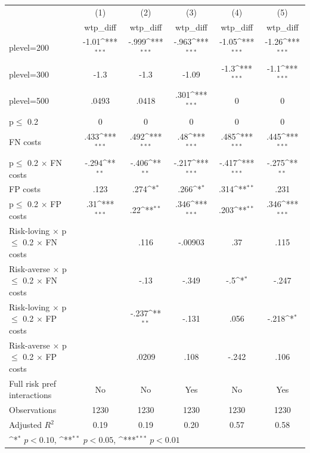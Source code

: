 {
\def\sym#1{\ifmmode^{#1}\else\(^{#1}\)\fi}
\begin{tabular}{l*{5}{c}}
\hline\hline
                &\multicolumn{1}{c}{(1)}&\multicolumn{1}{c}{(2)}&\multicolumn{1}{c}{(3)}&\multicolumn{1}{c}{(4)}&\multicolumn{1}{c}{(5)}\\
                &\multicolumn{1}{c}{wtp\_diff}&\multicolumn{1}{c}{wtp\_diff}&\multicolumn{1}{c}{wtp\_diff}&\multicolumn{1}{c}{wtp\_diff}&\multicolumn{1}{c}{wtp\_diff}\\
\hline
plevel=200      &    -1.01\sym{***}&    -.999\sym{***}&    -.963\sym{***}&    -1.05\sym{***}&    -1.26\sym{***}\\
plevel=300      &     -1.3         &     -1.3         &    -1.09         &     -1.3\sym{***}&     -1.1\sym{***}\\
plevel=500      &    .0493         &    .0418         &     .301\sym{***}&        0         &        0         \\
p$\leq$ 0.2     &        0         &        0         &        0         &        0         &        0         \\
FN costs        &     .433\sym{***}&     .492\sym{***}&      .48\sym{***}&     .485\sym{***}&     .445\sym{***}\\
p$\leq$ 0.2 $\times$ FN costs&    -.294\sym{**} &    -.406\sym{**} &    -.217\sym{***}&    -.417\sym{***}&    -.275\sym{**} \\
FP costs        &     .123         &     .274\sym{*}  &     .266\sym{*}  &     .314\sym{**} &     .231         \\
p$\leq$ 0.2 $\times$ FP costs&      .31\sym{***}&      .22\sym{**} &     .346\sym{***}&     .203\sym{**} &     .346\sym{***}\\
Risk-loving $\times$ p$\leq$ 0.2 $\times$ FN costs&                  &     .116         &  -.00903         &      .37         &     .115         \\
Risk-averse $\times$ p$\leq$ 0.2 $\times$ FN costs&                  &     -.13         &    -.349         &      -.5\sym{*}  &    -.247         \\
Risk-loving $\times$ p$\leq$ 0.2 $\times$ FP costs&                  &    -.237\sym{**} &    -.131         &     .056         &    -.218\sym{*}  \\
Risk-averse $\times$ p$\leq$ 0.2 $\times$ FP costs&                  &    .0209         &     .108         &    -.242         &     .106         \\
Full risk pref interactions&       No         &       No         &      Yes         &       No         &      Yes         \\
\hline
Observations    &     1230         &     1230         &     1230         &     1230         &     1230         \\
Adjusted \(R^{2}\)&     0.19         &     0.19         &     0.20         &     0.57         &     0.58         \\
\hline\hline
\multicolumn{6}{l}{\footnotesize \sym{*} \(p<0.10\), \sym{**} \(p<0.05\), \sym{***} \(p<0.01\)}\\
\end{tabular}
}

